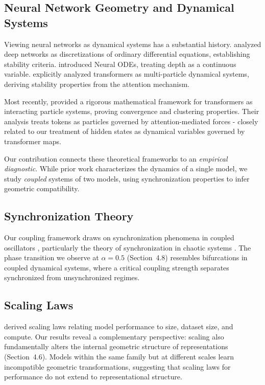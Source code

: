 \documentclass[10pt]{article} %
\theoremstyle{plain}
\theoremstyle{definition}
\theoremstyle{remark}
\begin{document}
\subsection{Neural Network Geometry and Dynamical Systems}

Viewing neural networks as dynamical systems has a substantial history. \citet{haber2017stable} analyzed deep networks as discretizations of ordinary differential equations, establishing stability criteria. \citet{chen2018neuralode} introduced Neural ODEs, treating depth as a continuous variable. \citet{lu2020understanding} explicitly analyzed transformers as multi-particle dynamical systems, deriving stability properties from the attention mechanism.

Most recently, \citet{geshkovski2024mathematical} provided a rigorous mathematical framework for transformers as interacting particle systems, proving convergence and clustering properties. Their analysis treats tokens as particles governed by attention-mediated forces - closely related to our treatment of hidden states as dynamical variables governed by transformer maps.

Our contribution connects these theoretical frameworks to an \textit{empirical diagnostic}. While prior work characterizes the dynamics of a single model, we study \textit{coupled} systems of two models, using synchronization properties to infer geometric compatibility.

\subsection{Synchronization Theory}

Our coupling framework draws on synchronization phenomena in coupled oscillators \citep{kuramoto1984chemical,strogatz2000}, particularly the theory of synchronization in chaotic systems \citep{pecora1990}. The phase transition we observe at $\alpha = 0.5$ (Section~4.8) resembles bifurcations in coupled dynamical systems, where a critical coupling strength separates synchronized from unsynchronized regimes.

\subsection{Scaling Laws}

\citet{kaplan2020scaling} derived scaling laws relating model performance to size, dataset size, and compute. Our results reveal a complementary perspective: scaling also fundamentally alters the internal geometric structure of representations (Section~4.6). Models within the same family but at different scales learn incompatible geometric transformations, suggesting that scaling laws for performance do not extend to representational structure.
\end{document}
